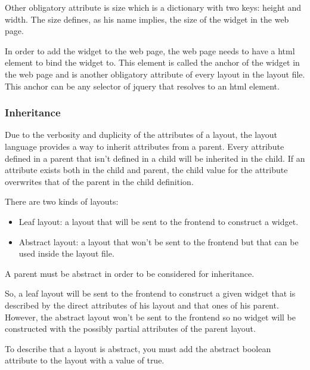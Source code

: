 \documentclass[12pt]{article}
\begin{document}
            Other obligatory attribute is size which is a dictionary with two
            keys: height and width. The size defines, as his name implies,
            the size of the widget in the web page.

            In order to add the widget to the web page, the web page needs to
            have a html element to bind the widget to. This element is called
            the anchor of the widget in the web page and is another obligatory
            attribute of every layout in the layout file. This anchor can be any
            selector of jquery that resolves to an html element.

            \subsubsection{Inheritance}
                Due to the verbosity and duplicity of the attributes of a
                layout, the layout language provides a way to inherit attributes
                from a parent. Every attribute defined in a parent that isn't
                defined in a child will be inherited in the child. If an
                attribute exists both in the child and parent, the child value
                for the attribute overwrites that of the parent in the child
                definition.

                There are two kinds of layouts:
                \begin{itemize}
                    \item Leaf layout: a layout that will be sent to the frontend
                          to construct a widget.
                    \item Abstract layout: a layout that won't be sent to the
                          frontend but that can be used inside the layout file.
                \end{itemize}

                A parent must be abstract in order to be considered for
                inheritance.

                So, a leaf layout will be sent to the frontend to construct a
                given widget that is described by the direct attributes of his
                layout and that ones of his parent. However, the abstract layout
                won't be sent to the frontend so no widget will be constructed
                with the possibly partial attributes of the parent layout.

                To describe that a layout is abstract, you must add the abstract
                boolean attribute to the layout with a value of true.
\end{document}
